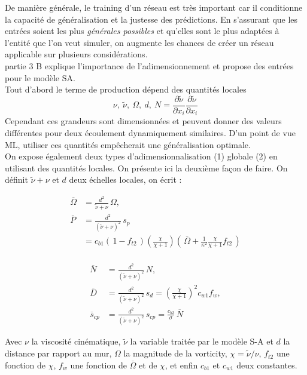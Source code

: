 \documentclass[a4paper,12pt]{report}
\newcommand{\bepar}[1]{
	\left( #1 \right)  
}
\numberwithin{equation}{section} %
\begin{document}
\noindent De manière générale, le training d'un réseau est très important car il conditionne la capacité de généralisation et la justesse des prédictions. En s'assurant que les entrées soient les plus \textit{générales possibles} et qu'elles sont le plus adaptées à l'entité que l'on veut simuler, on augmente les chances de créer un réseau applicable sur plusieurs considérations.\\
\cite{tracey2015machine} partie 3 B explique l'importance de l'adimensionnement et propose des entrées pour le modèle SA. \\
Tout d'abord le terme de production dépend des quantités locales $$\nu, \ \tilde{\nu}, \ \Omega, \ d, \ N=\frac{\partial \tilde{\nu}}{\partial x_i}\frac{\partial \tilde{\nu}}{\partial x_i}$$
Cependant ces grandeurs sont dimensionnées et peuvent donner des valeurs différentes pour deux écoulement dynamiquement similaires. D'un point de vue ML, utiliser ces quantités empêcherait une généralisation optimale.\\ 
On expose également deux types d'adimensionnalisation (1) globale (2) en utilisant des quantités locales. On présente ici la deuxième façon de faire. On définit $\tilde{\nu} + \nu$ et $d$ deux échelles locales, on écrit :
\begin{multicols}{2}

\begin{align*}
\overline{\Omega} &= \frac{d^2}{\tilde{\nu} + \nu}\, \Omega, \\[0.3cm]
\overline{P} &= \frac{d^2}{\bepar{\tilde{\nu} + \nu}^2}\, s_p \\
&= c_{b1} \bepar{\,1-f_{t2}\,}\bepar{\frac{\chi}{\chi +1}}\bepar{\, \bar{\Omega} + \frac{1}{\kappa^2} \frac{\chi}{\chi + 1}f_{t2} \,} \\[0.3cm]
\end{align*}

\columnbreak

\begin{align*}
\overline{N} &= \frac{d^2}{\bepar{\tilde{\nu} + \nu}^2} \, N, \\[0.3cm]
\overline{D} &= \frac{d^2}{\bepar{\tilde{\nu} + \nu}^2}\, s_d = \bepar{\frac{\chi}{\chi +1}}^2 c_{w1} f_{w}, \\[0.3cm]
\overline{s}_{cp} &= \frac{d^2}{\bepar{\tilde{\nu} + \nu}^2}\, s_{cp} = \frac{c_{b2}}{\sigma}\, \overline{N} 
\end{align*} 

\end{multicols}

Avec $\nu$ la viscosité cinématique, $\tilde{\nu}$ la variable traitée par le modèle S-A et $d$ la distance par rapport au mur, $\Omega$ la magnitude de la vorticity, $\chi = \tilde{\nu} / \nu$, $f_{t2}$ une fonction de $\chi$, $f_{w}$ une fonction de $\overline{\Omega}$ et de $\chi$, et enfin $c_{b1}$ et $c_{w1}$ deux constantes.\\
\end{document}
